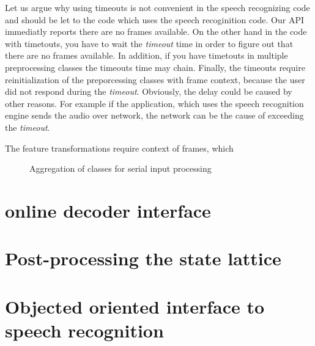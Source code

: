 Let us argue why using timeouts is not convenient in the speech recognizing code
and should be let to the code which uses the speech recoginition code.
Our \ac{API} immediatly reports there are no frames available.
On the other hand in the code with timetouts, you have to wait the {\it timeout}\/ time
in order to figure out that there are no frames available.
In addition, if you have timetouts in multiple preprocessing classes the timeouts time may chain.
Finally, the timeouts require reinitialization of the preporcessing classes with frame context,
because the user did not respond during the {\it timeout}\/. 
Obviously, the delay could be caused by other reasons. For example if the application, 
which uses the speech recognition engine sends the audio over network, the network can be
the cause of exceeding the {\it timeout}\/.








The feature transformations require context of frames, which

\begin{figure}[!ph]
    \begin{center}
        
    \caption{Aggregation of classes for serial input processing}
    \label{fig:classes} 
    \end{center}
\end{figure}


\section{online decoder interface} 
\label{sec:improve}




\section{Post-processing the state lattice}
\label{sec:postprocess}



\section{Objected oriented interface to speech recognition}
\label{sec:ooi}

